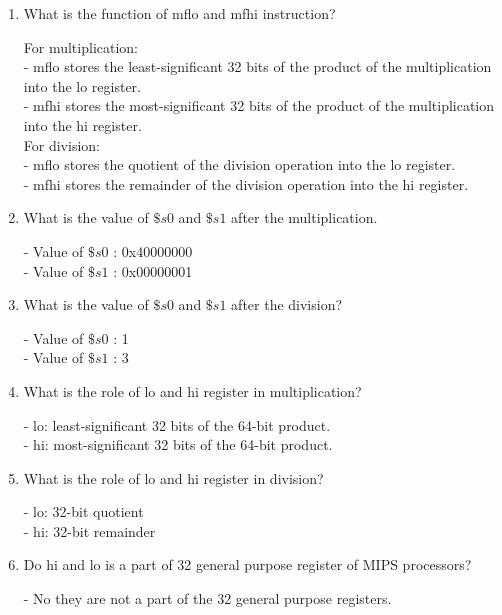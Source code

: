 \documentclass[12pt,a4paper]{article}
\begin{document}
\begin{enumerate}
  \item What is the function of mflo and mfhi instruction?

        For multiplication:\\
        - mflo stores the least-significant 32 bits of the product of the multiplication into the lo register. \\
        - mfhi stores the most-significant 32 bits of the product of the multiplication into the hi register. \\

        For division:\\
        - mflo stores the quotient of the division operation into the lo register. \\
        - mfhi stores the remainder of the division operation into the hi register.\\

  \item What is the value of $\$s0$ and $\$s1$ after the multiplication.

        - Value of $\$s0$ : 0x40000000 \\
        - Value of $\$s1$ : 0x00000001 \\

  \item What is the value of $\$s0$ and $\$s1$ after the division?

        - Value of $\$s0$ : 1 \\
        - Value of $\$s1$ : 3 \\

  \item What is the role of lo and hi register in multiplication?

        - lo: least-significant 32 bits of the 64-bit product.\\
        - hi: most-significant 32 bits of the 64-bit product. \\

  \item What is the role of lo and hi register in division?

        - lo: 32-bit quotient\\
        - hi: 32-bit remainder \\

  \item Do hi and lo is a part of 32 general purpose register of MIPS processors?

        - No they are not a part of the 32 general purpose registers.

\end{enumerate}
\end{document}
